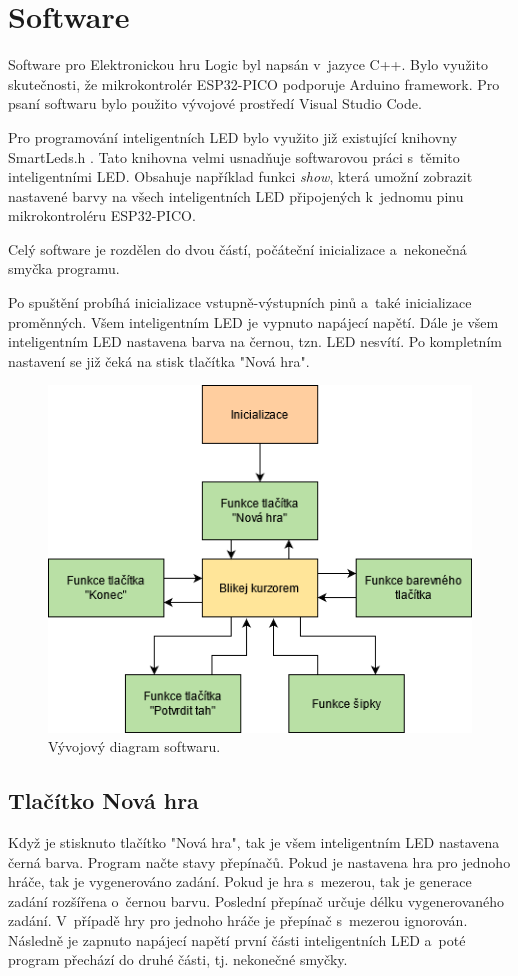 \chapter{Software}
Software pro Elektronickou hru Logic byl napsán v~jazyce C++. Bylo využito skutečnosti, že mikrokontrolér ESP32-PICO podporuje Arduino 
framework. Pro psaní softwaru bylo použito vývojové prostředí Visual Studio Code.

Pro programování inteligentních LED bylo využito již existující knihovny SmartLeds.h \cite{SmartLeds}.
Tato knihovna velmi usnadňuje softwarovou práci s~těmito inteligentními LED. Obsahuje například funkci {\it show}, která umožní zobrazit 
nastavené barvy na všech inteligentních LED připojených k~jednomu pinu mikrokontroléru ESP32-PICO. 

Celý software je rozdělen do dvou částí, počáteční inicializace a~nekonečná smyčka programu. 

Po spuštění probíhá inicializace vstupně-výstupních pinů a~také inicializace proměnných. Všem inteligentním LED je vypnuto napájecí napětí. 
Dále je všem inteligentním LED nastavena barva na černou, tzn. LED nesvítí. Po kompletním nastavení se již čeká na stisk tlačítka "Nová hra". 

\begin{figure}[!h]
    \begin{center}
      \includegraphics[scale=0.6]{obrazky/Celek.png}
    \end{center}
    \caption[Vývojový diagram softwaru]{Vývojový diagram softwaru.}
  \end{figure}

\newpage
\section{Tlačítko Nová hra}
Když je stisknuto tlačítko "Nová hra", tak je všem inteligentním LED nastavena černá barva. Program načte stavy přepínačů. Pokud je nastavena hra pro 
jednoho hráče, tak je vygenerováno zadání. Pokud je hra s~mezerou, tak je generace zadání rozšířena o~černou barvu. Poslední přepínač určuje délku 
vygenerovaného zadání. V~případě hry pro jednoho hráče je přepínač s~mezerou ignorován. Následně je zapnuto napájecí napětí 
první části inteligentních LED a~poté program přechází do druhé části, tj. nekonečné smyčky.

